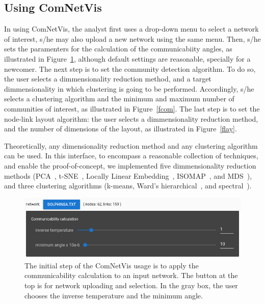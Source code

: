 \documentclass[Afour,sagev,times]{sagej}
\begin{document}
\subsection{Using ComNetVis}\label{suse}
In using ComNetVis, the analyst first uses a drop-down menu to select
a network of interest, s/he may also upload a new network using the same menu.
Then, s/he sets the paramenters for the calculation of the communicabiity angles, as illustrated in Figure~\ref{finitial}, although default settings are reasonable, specially for a newcomer.
The next step is to set the community detection algorithm.
To do so, the user selects a dimmensionality reduction method, and a target dimmensionality in which clustering is going to be performed.
Accordingly, s/he selects a clustering algorithm and the minimum and maximum number of communities of interest, as illustrated in Figure~\ref{fcom}.
The last step is to set the node-link layout algorithm:
the user selects a dimmensionality reduction method,
and the number of dimensions of the layout,
as illustrated in Figure~\ref{flay}.

Theoretically,
any dimensionality reduction method
and any clustering algorithm
can be used.
In this interface, to encompass a reasonable collection of techniques,
and enable the proof-of-concept,
we implemented five dimmensionality reduction methods
(PCA~\cite{pca}, t-SNE~\cite{tsne}, Locally Linear Embedding~\cite{lle},
ISOMAP~\cite{isomap}, and MDS~\cite{mds}),
and three clustering algorithms (k-means,
Ward's hierarchical~\cite{ward}, and spectral~\cite{spectral}).



\begin{figure}\centering
 \includegraphics[width=\columnwidth]{figs/initial}
  \caption{The initial step of the ComNetVis usage is to apply the communicability calculation to an input network.
  The button at the top is for network uploading and selection.
  In the gray box, the user chooses the inverse temperature and the minimum angle.
  }\label{finitial}
\end{figure}
\end{document}

